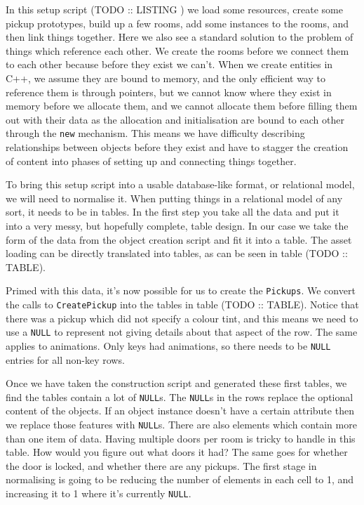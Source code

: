 \documentclass[a4paper,12pt]{article}
\begin{document}
In this setup script (TODO :: LISTING ) we load some resources, create some pickup prototypes, build up a few rooms, add some instances to the rooms, and then link things together.
Here we also see a standard solution to the problem of things which reference each other.
We create the rooms before we connect them to each other because before they exist we can't.
When we create entities in C++, we assume they are bound to memory, and the only efficient way to reference them is through pointers, but we cannot know where they exist in memory before we allocate them, and we cannot allocate them before filling them out with their data as the allocation and initialisation are bound to each other through the \texttt{new} mechanism.
This means we have difficulty describing relationships between objects before they exist and have to stagger the creation of content into phases of setting up and connecting things together.

To bring this setup script into a usable database-like format, or relational model, we will need to normalise it.
When putting things in a relational model of any sort, it needs to be in tables.
In the first step you take all the data and put it into a very messy, but hopefully complete, table design.
In our case we take the form of the data from the object creation script and fit it into a table.
The asset loading can be directly translated into tables, as can be seen in table (TODO :: TABLE).

Primed with this data, it's now possible for us to create the \texttt{Pickups}.
We convert the calls to \texttt{CreatePickup} into the tables in table (TODO :: TABLE).
Notice that there was a pickup which did not specify a colour tint, and this means we need to use a \texttt{NULL} to represent not giving details about that aspect of the row.
The same applies to animations.
Only keys had animations, so there needs to be \texttt{NULL} entries for all non-key rows.

Once we have taken the construction script and generated these first tables, we find the tables contain a lot of \texttt{NULL}s.
The \texttt{NULL}s in the rows replace the optional content of the objects.
If an object instance doesn't have a certain attribute then we replace those features with \texttt{NULL}s.
There are also elements which contain more than one item of data.
Having multiple doors per room is tricky to handle in this table.
How would you figure out what doors it had?
The same goes for whether the door is locked, and whether there are any pickups.
The first stage in normalising is going to be reducing the number of elements in each cell to 1, and increasing it to 1 where it's currently \texttt{NULL}.
\end{document}
